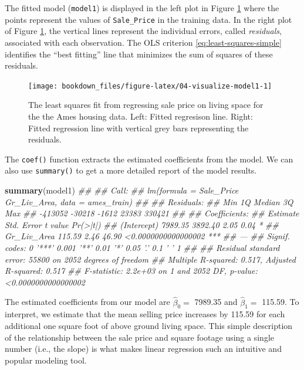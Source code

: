 \documentclass[]{krantz}
\makeatletter
\newenvironment{Shaded}{\begin{snugshade}}{\end{snugshade}}
\newcommand{\CommentTok}[1]{\textcolor[rgb]{0.37,0.37,0.37}{\textit{#1}}}
\newcommand{\KeywordTok}[1]{\textcolor[rgb]{0.27,0.27,0.27}{\textbf{#1}}}
\newcommand{\NormalTok}[1]{#1}
\newenvironment{kframe}{%
\medskip{}
\setlength{\fboxsep}{.8em}
 \def\at@end@of@kframe{}%
 \ifinner\ifhmode%
  \def\at@end@of@kframe{\end{minipage}}%
  \begin{minipage}{\columnwidth}%
 \fi\fi%
 \def\FrameCommand##1{\hskip\@totalleftmargin \hskip-\fboxsep
 \colorbox{shadecolor}{##1}\hskip-\fboxsep
     \hskip-\linewidth \hskip-\@totalleftmargin \hskip\columnwidth}%
 \MakeFramed {\advance\hsize-\width
   \@totalleftmargin\z@ \linewidth\hsize
   \@setminipage}}%
 {\par\unskip\endMakeFramed%
 \at@end@of@kframe}
\renewenvironment{Shaded}{\begin{kframe}}{\end{kframe}}
\makeatother
\begin{document}
The fitted model (\texttt{model1}) is displayed in the left plot in Figure \ref{fig:04-visualize-model1} where the points represent the values of \texttt{Sale\_Price} in the training data. In the right plot of Figure \ref{fig:04-visualize-model1}, the vertical lines represent the individual errors, called \emph{residuals}, associated with each observation. The OLS criterion \eqref{eq:least-squares-simple} identifies the ``best fitting'' line that minimizes the sum of squares of these residuals.

\begin{figure}

{\centering \texttt{[image: bookdown\_files/figure-latex/04-visualize-model1-1]} 

}

\caption{The least squares fit from regressing sale price on living space for the the Ames housing data. Left: Fitted regresison line. Right: Fitted regression line with vertical grey bars representing the residuals.}\label{fig:04-visualize-model1}
\end{figure}

The \texttt{coef()} function extracts the estimated coefficients from the model. We can also use \texttt{summary()} to get a more detailed report of the model results.

\begin{Shaded}
\begin{Highlighting}[]
\KeywordTok{summary}\NormalTok{(model1)}
\CommentTok{## }
\CommentTok{## Call:}
\CommentTok{## lm(formula = Sale_Price ~ Gr_Liv_Area, data = ames_train)}
\CommentTok{## }
\CommentTok{## Residuals:}
\CommentTok{##     Min      1Q  Median      3Q     Max }
\CommentTok{## -413052  -30218   -1612   23383  330421 }
\CommentTok{## }
\CommentTok{## Coefficients:}
\CommentTok{##             Estimate Std. Error t value            Pr(>|t|)    }
\CommentTok{## (Intercept)  7989.35    3892.40    2.05                0.04 *  }
\CommentTok{## Gr_Liv_Area   115.59       2.46   46.90 <0.0000000000000002 ***}
\CommentTok{## ---}
\CommentTok{## Signif. codes:  0 '***' 0.001 '**' 0.01 '*' 0.05 '.' 0.1 ' ' 1}
\CommentTok{## }
\CommentTok{## Residual standard error: 55800 on 2052 degrees of freedom}
\CommentTok{## Multiple R-squared:  0.517,  Adjusted R-squared:  0.517 }
\CommentTok{## F-statistic: 2.2e+03 on 1 and 2052 DF,  p-value: <0.0000000000000002}
\end{Highlighting}
\end{Shaded}

The estimated coefficients from our model are \(\widehat{\beta}_0 =\) 7989.35 and \(\widehat{\beta}_1 =\) 115.59. To interpret, we estimate that the mean selling price increases by 115.59 for each additional one square foot of above ground living space. This simple description of the relationship between the sale price and square footage using a single number (i.e., the slope) is what makes linear regression such an intuitive and popular modeling tool.
\end{document}
